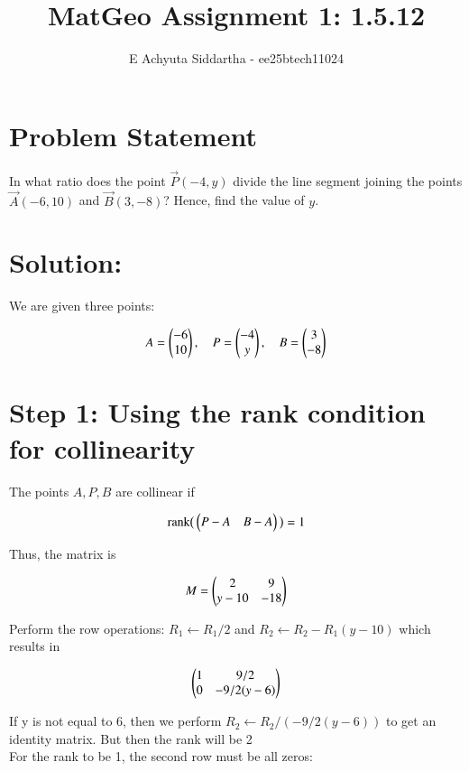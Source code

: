 \documentclass[14pt, a4paper]{extarticle}
\title{MatGeo Assignment 1: 1.5.12}
\author{E Achyuta Siddartha - ee25btech11024}
\begin{document}
\maketitle

\section*{Problem Statement}
In what ratio does the point $\vec{P}(-4, y)$ divide the line segment joining the points $\vec{A}(-6, 10)$ and $\vec{B}(3, -8)$? Hence, find the value of $y$.

\hr

\noindent
\section*{Solution:}

\noindent
We are given three points:

\begin{align}
A = \begin{pmatrix}-6 \\ 10\end{pmatrix}, \quad 
P = \begin{pmatrix}-4 \\ y\end{pmatrix}, \quad 
B = \begin{pmatrix}3 \\ -8\end{pmatrix}
\end{align}

\section*{Step 1: Using the rank condition for collinearity}

The points \(A, P, B\) are collinear if

\begin{align}
\text{rank}\big(\begin{pmatrix}P-A & B-A\end{pmatrix}\big) = 1
\end{align}

\noindent
Thus, the matrix is

\begin{align}
M = \begin{pmatrix}2 & 9 \\ y-10 & -18\end{pmatrix}
\end{align}

\noindent
Perform the row operations: $R_1 \leftarrow R_1/2$ and $R_2 \leftarrow R_2 - R_1(y-10)$  which results in

\begin{align}
\begin{pmatrix}1 & 9/2 \\ 0 & -9/2(y-6)\end{pmatrix}
\end{align}

\noindent
If y is not equal to 6, then we perform $R_2 \leftarrow R_2/(-9/2(y-6))$ to get an identity matrix. But then the rank will be 2 \\
For the rank to be 1, the second row must be all zeros:
\end{document}
